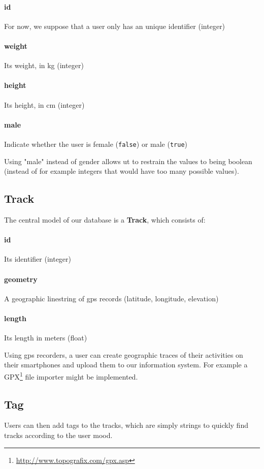 \documentclass[a4paper]{article}
\begin{document}
\paragraph{id} For now, we suppose that a user only has an unique identifier (integer)
\paragraph{weight} Its weight, in kg (integer)
\paragraph{height} Its height, in cm (integer)
\paragraph{male} Indicate whether the user is female (\texttt{false}) or male (\texttt{true})

Using "male" instead of gender allows ut to restrain the values to being boolean (instead of for example integers that would have too many possible values).


\subsection{Track}
The central model of our database is a \textbf{Track}, which consists of:

\paragraph{id} Its identifier (integer)
\paragraph{geometry} A geographic linestring of gps records (latitude, longitude, elevation)
\paragraph{length} Its length in meters (float)

Using gps recorders, a user can create geographic traces of their activities on
their smartphones and upload them to our information system. For example a GPX\footnote{\url{http://www.topografix.com/gpx.asp}}
file importer might be implemented.


\subsection{Tag}
Users can then add tags to the tracks, which are simply strings to quickly find
tracks according to the user mood.
\end{document}
